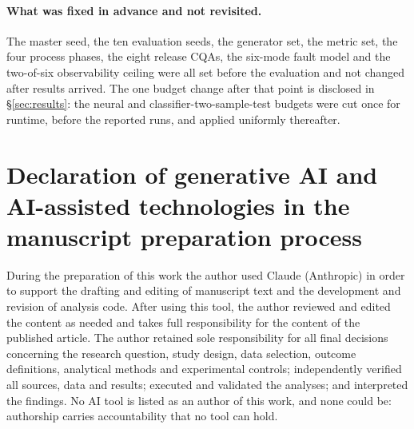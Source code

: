 \documentclass[11pt]{article}
\begin{document}
\paragraph{What was fixed in advance and not revisited.} The master seed, the
ten evaluation seeds, the generator set, the metric set, the four process phases,
the eight release CQAs, the six-mode fault model and the two-of-six observability
ceiling were all set before the evaluation and not changed after results arrived.
The one budget change after that point is disclosed in \S\ref{sec:results}: the
neural and classifier-two-sample-test budgets were cut once for runtime, before
the reported runs, and applied uniformly thereafter.

\section*{Declaration of generative AI and AI-assisted technologies in the
manuscript preparation process}

During the preparation of this work the author used Claude (Anthropic) in order
to support the drafting and editing of manuscript text and the development and
revision of analysis code. After using this tool, the author reviewed and edited
the content as needed and takes full responsibility for the content of the
published article. The author retained sole responsibility for all final
decisions concerning the research question, study design, data selection, outcome
definitions, analytical methods and experimental controls; independently verified
all sources, data and results; executed and validated the analyses; and
interpreted the findings. No AI tool is listed as an author of this work, and
none could be: authorship carries accountability that no tool can hold.



\end{document}
